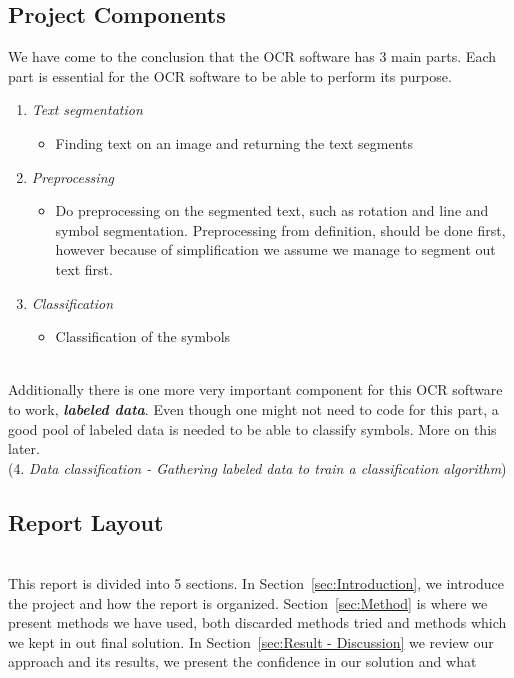 \documentclass[11pt,a4paper,UKenglish]{article}
\begin{document}
\subsection{Project Components}
We have come to the conclusion that the OCR software has 3 main parts. Each
part is essential for the OCR software to be able to perform its purpose.
\begin{enumerate}
 \item{\textit{Text segmentation}}
 \begin{itemize}
  \item{Finding text on an image and returning the text segments}
 \end{itemize}
 \item{\textit{Preprocessing}}
 \begin{itemize}
  \item{Do preprocessing on the segmented text, such as rotation and line and
  symbol segmentation. Preprocessing from definition, should be done first,
  however because of simplification we assume we manage to segment out text
  first.}
 \end{itemize}
 \item{\textit{Classification}}
 \begin{itemize}
  \item{Classification of the symbols}
 \end{itemize}
\end{enumerate}
\noindent \\ Additionally there is one more very important component for this
OCR software to work, \textit{\textbf{labeled data}}. Even though one might not
need to code for this part, a good pool of labeled data is needed to be able to
classify symbols. More on this later.
\noindent \\ (4. \textit{Data classification - Gathering labeled data to train a classification algorithm})


\subsection{Report Layout}
\noindent \\ This report is divided into 5 sections. In
Section~\ref{sec:Introduction}, we introduce the project and how the report
is organized. Section~\ref{sec:Method} is where we present methods we have
used, both discarded methods tried and methods which we kept in out final
solution. In Section~\ref{sec:Result - Discussion} we review our approach and
its results, we present the confidence in our solution and what 
\end{document}
